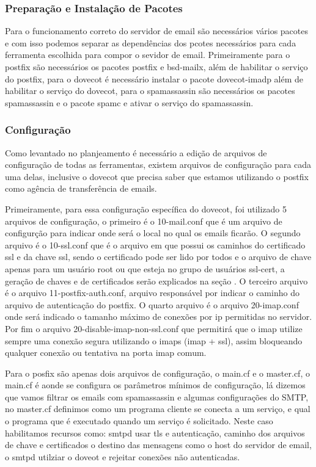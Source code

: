 \subsubsection{Preparação e Instalação de Pacotes }

Para o funcionamento correto do servidor de email são necessários vários pacotes
e com isso podemos separar as dependências dos pcotes necessários para cada ferramenta
escolhida para compor o sevidor de email. Primeiramente para o postfix são necessários
os pacotes postfix e bsd-mailx, além de habilitar o serviço do postfix, para o dovecot
é necessário instalar o pacote dovecot-imadp além de habilitar o serviço do dovecot,
para o spamassassin são necessários os pacotes spamassassin e o pacote spamc e ativar
o serviço do spamassassin.

\subsubsection{Configuração}

Como levantado no planjeamento é necessário a edição de arquivos de configuração
de todas as ferramentas, existem arquivos de configuração para cada uma delas, inclusive
o dovecot que precisa saber que estamos utilizando o postfix como agência de transferência
de emails.

Primeiramente, para essa configuração específica do dovecot, foi utilizado 5 arquivos
de configuração, o primeiro é o 10-mail.conf que é um arquivo de configurção para
indicar onde será o local no qual os emails ficarão. O segundo arquivo é o 10-ssl.conf
que é o arquivo em que possui os caminhos do certificado ssl e da chave ssl, sendo o
certificado pode ser lido por todos e o arquivo de chave apenas para um usuário root
ou que esteja no grupo de usuários ssl-cert, a geração de chaves e de certificados serão
explicados na seção %
. O terceiro arquivo é o arquivo
11-postfix-auth.conf, arquivo responsável por indicar o caminho do arquivo de autenticação
do postfix. O quarto arquivo é o arquivo 20-imap.conf onde será indicado o tamanho
máximo de conexões por ip permitidas no servidor. Por fim o arquivo
20-disable-imap-non-ssl.conf que permitirá que o imap utilize sempre uma conexão
segura utilizando o imaps (imap + ssl), assim bloqueando qualquer conexão ou
tentativa na porta imap comum.

Para o posfix são apenas dois arquivos de configuração, o main.cf e o master.cf,
o main.cf é aonde se configura os parâmetros mínimos de configuração, lá dizemos
que vamos filtrar os emails com spamassassin e algumas configurações do SMTP, no
master.cf definimos como um programa cliente se conecta a um serviço, e qual o
programa que é executado quando um serviço é solicitado. Neste caso habilitamos
recursos como: smtpd usar tls e autenticação, caminho dos arquivos de chave e certificados
o destino das mensagens como o host do servidor de email, o smtpd utilziar o doveot
e rejeitar conexões não autenticadas.

